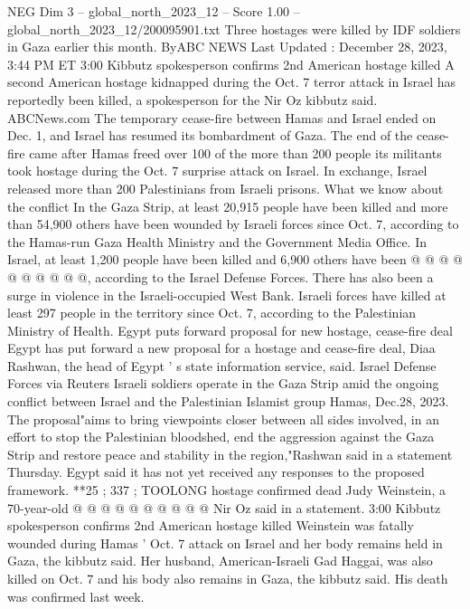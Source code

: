 \begin{textsample}{NEG Dim 3 – global\_north\_2023\_12 – Score 1.00 – global\_north\_2023\_12/200095901.txt}  \label{ex:f3_neg_199}
Three hostages were killed by IDF soldiers in Gaza earlier this month.
ByABC NEWS Last Updated : December 28, 2023, 3:44 PM ET 3:00 Kibbutz spokesperson confirms 2nd American hostage killed A second American hostage kidnapped during the Oct. 7 terror attack in Israel has reportedly been killed, a spokesperson for the Nir Oz kibbutz said.
ABCNews.com The temporary cease-fire between Hamas and Israel ended on Dec. 1, and Israel has resumed its bombardment of Gaza.
The end of the cease-fire came after Hamas freed over 100 of the more than 200 people its militants took hostage during the Oct. 7 surprise attack on Israel.
In exchange, Israel released more than 200 Palestinians from Israeli prisons.
What we know about the conflict In the Gaza Strip, at least 20,915 people have been killed and more than 54,900 others have been wounded by Israeli forces since Oct. 7, according to the Hamas-run Gaza Health Ministry and the Government Media Office.
In Israel, at least 1,200 people have been killed and 6,900 others have been @ @ @ @ @ @ @ @ @ @, according to the Israel Defense Forces.
There has also been a surge in violence in the Israeli-occupied West Bank.
Israeli forces have killed at least 297 people in the territory since Oct. 7, according to the Palestinian Ministry of Health.
Egypt puts forward proposal for new hostage, cease-fire deal Egypt has put forward a new proposal for a hostage and cease-fire deal, Diaa Rashwan, the head of Egypt ' s state information service, said.
Israel Defense Forces via Reuters Israeli soldiers operate in the Gaza Strip amid the ongoing conflict between Israel and the Palestinian Islamist group Hamas, Dec.28, 2023.
The proposal"aims to bring viewpoints closer between all sides involved, in an effort to stop the Palestinian bloodshed, end the aggression against the Gaza Strip and restore peace and stability in the region,"Rashwan said in a statement Thursday.
Egypt said it has not yet received any responses to the proposed framework. **25 ; 337 ; TOOLONG hostage confirmed dead Judy Weinstein, a 70-year-old @ @ @ @ @ @ @ @ @ @ Nir Oz said in a statement. 3:00 Kibbutz spokesperson confirms 2nd American hostage killed Weinstein was fatally wounded during Hamas ' Oct. 7 attack on Israel and her body remains held in Gaza, the kibbutz said.
Her husband, American-Israeli Gad Haggai, was also killed on Oct. 7 and his body also remains in Gaza, the kibbutz said.
His death was confirmed last week.

\end{textsample}
